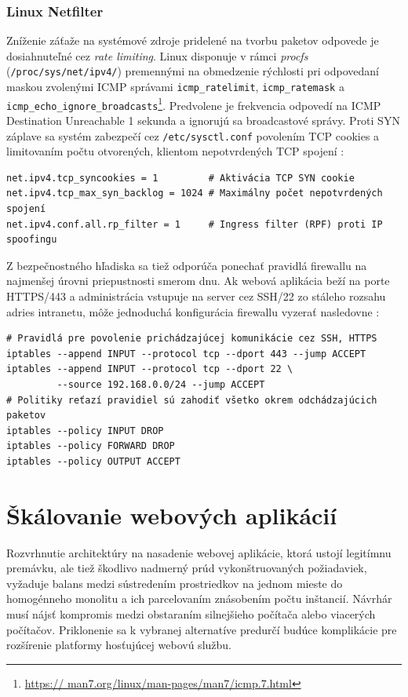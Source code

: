 \documentclass[12pt, a4paper]{article}
\begin{document}
\subsubsection{Linux Netfilter}
Zníženie záťaže na systémové zdroje pridelené na tvorbu paketov odpovede je dosiahnuteľné cez 
\emph{rate limiting}. Linux disponuje v rámci \emph{procfs} (\verb|/proc/sys/net/ipv4/|) premennými 
na obmedzenie rýchlosti pri odpovedaní maskou zvolenými ICMP správami \verb|icmp_ratelimit|, 
\verb|icmp_ratemask| a \verb|icmp_echo_ignore_broadcasts|\footnote{\url{https://
man7.org/linux/man-pages/man7/icmp.7.html}}. Predvolene je frekvencia odpovedí na 
ICMP Destination Unreachable 1 sekunda a ignorujú sa broadcastové správy. Proti SYN záplave sa
systém zabezpečí cez \verb|/etc/sysctl.conf| povolením TCP cookies a limitovaním
počtu otvorených, klientom nepotvrdených TCP spojení \cite{haproxy-ddos}:
\begin{lstlisting}
net.ipv4.tcp_syncookies = 1         # Aktivácia TCP SYN cookie
net.ipv4.tcp_max_syn_backlog = 1024 # Maximálny počet nepotvrdených spojení
net.ipv4.conf.all.rp_filter = 1     # Ingress filter (RPF) proti IP spoofingu  
\end{lstlisting}

Z bezpečnostného hľadiska sa tiež odporúča ponechať pravidlá firewallu na najmenšej úrovni priepustnosti 
smerom dnu. Ak webová aplikácia beží na porte HTTPS/443 a 
administrácia vstupuje na server cez SSH/22 zo stáleho rozsahu adries intranetu, môže jednoduchá 
konfigurácia firewallu vyzerať nasledovne \cite{csirt-hardening}:
\begin{lstlisting}
# Pravidlá pre povolenie prichádzajúcej komunikácie cez SSH, HTTPS
iptables --append INPUT --protocol tcp --dport 443 --jump ACCEPT
iptables --append INPUT --protocol tcp --dport 22 \ 
         --source 192.168.0.0/24 --jump ACCEPT
# Politiky reťazí pravidiel sú zahodiť všetko okrem odchádzajúcich paketov
iptables --policy INPUT DROP
iptables --policy FORWARD DROP
iptables --policy OUTPUT ACCEPT
\end{lstlisting}

\section{Škálovanie webových aplikácií}
Rozvrhnutie architektúry na nasadenie webovej aplikácie, ktorá ustojí legitímnu premávku, ale tiež 
škodlivo nadmerný prúd vykonštruovaných požiadaviek, vyžaduje balans medzi sústredením prostriedkov na 
jednom mieste do homogénneho monolitu a ich parcelovaním znásobením počtu inštancií. Návrhár musí 
nájsť kompromis medzi obstaraním silnejšieho počítača alebo viacerých počítačov. Priklonenie 
sa k vybranej alternatíve predurčí budúce komplikácie pre rozšírenie platformy hosťujúcej webovú 
službu. 
\end{document}
